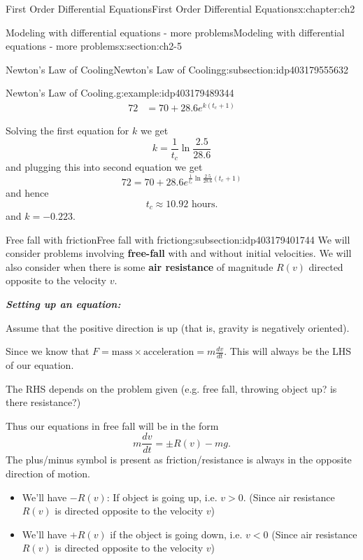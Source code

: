 \documentclass[oneside,10pt,]{book}
\newcommand{\alert}[1]{\textbf{\textit{#1}}}
\newcommand{\terminology}[1]{\textbf{#1}}
\numberwithin{equation}{section}
\numberwithin{equation}{section}
\newcommand{\lt}{<}
\newcommand{\amp}{&}
\begin{document}
\begin{chapterptx}{First Order Differential Equations}{}{First Order Differential Equations}{}{}{x:chapter:ch2}
\begin{sectionptx}{Modeling with differential equations - more problems}{}{Modeling with differential equations - more problems}{}{}{x:section:ch2-5}
\begin{subsectionptx}{Newton's Law of Cooling}{}{Newton's Law of Cooling}{}{}{g:subsection:idp403179555632}
\begin{example}{Newton's Law of Cooling.}{g:example:idp403179489344}
\begin{align*}
72 \amp =70+28.6e^{k(t_{c}+1)}
\end{align*}
%
\par
Solving the first equation for \(k\) we get%
\begin{equation*}
k=\frac{1}{t_{c}}\ln\frac{2.5}{28.6}
\end{equation*}
and plugging this into second equation we get%
\begin{equation*}
72=70+28.6e^{\frac{1}{t_{c}}\ln\frac{2.5}{28.6}(t_{c}+1)}
\end{equation*}
and hence%
\begin{equation*}
t_{c}\approx10.92\text{ hours}.
\end{equation*}
and \(k=-0.223\).%
\end{example}
\end{subsectionptx}
%
%
\typeout{************************************************}
\typeout{************************************************}
%
\begin{subsectionptx}{Free fall with friction}{}{Free fall with friction}{}{}{g:subsection:idp403179401744}
We will consider problems involving \terminology{free-fall} with and without initial velocities. We will also consider when there is some \terminology{air resistance} of magnitude \(R(v)\) directed opposite to the velocity \(v\).%
\par
\alert{Setting up an equation:}%
\par
Assume that the positive direction is up (that is, gravity is negatively oriented).%
\par
Since we know that \(F=\text{mass}\times\text{acceleration}=m\frac{dv}{dt}\). This will always be the LHS of our equation.%
\par
The RHS depends on the problem given (e.g. free fall, throwing object up? is there resistance?)%
\par
Thus our equations in free fall will be in the form%
\begin{equation*}
m\frac{dv}{dt}=\pm R(v) - mg.
\end{equation*}
The plus\slash{}minus symbol is present as friction\slash{}resistance is always in the opposite direction of motion.%
%
\begin{itemize}[label=\textbullet]
\item{}We'll have \(-R(v)\): If object is going up, i.e. \(v>0\). (Since air resistance \(R(v)\) is directed opposite to the velocity \(v\))%
\item{}We'll have \(+R(v)\) if the object is going down, i.e. \(v\lt0\) (Since air resistance \(R(v)\) is directed opposite to the velocity \(v\))%

\end{itemize}
\end{subsectionptx}
\end{sectionptx}
\end{chapterptx}
\end{document}
